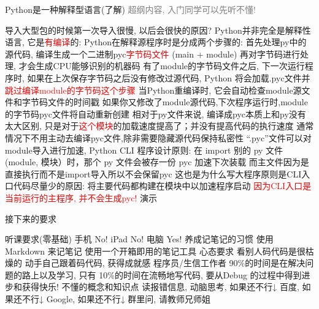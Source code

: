 \begin{frame}{Python是一种解释型语言(了解)}
    \tiny{\textcolor{gray}{超纲内容, 入门同学可以先听不懂!}}
    \begin{myoutline}
        \1 导入大型包的时候第一次导入很慢, 以后会很快的原因?
        \1 Python并非完全是解释性语言, 它是\textcolor{red}{有编译}的:
            \2 Python在解释源程序时是分成两个步骤的:
                \3 首先处理py中的源代码, 编译生成一个二进制pyc\textcolor{red}{字节码文件} (main + module)
                \3 再对字节码进行处理, 才会生成CPU能够识别的机器码
                \3 有了module的字节码文件之后, 下一次运行程序时, 如果在上次保存字节码之后没有修改过源代码, Python 将会加载.pyc文件并\textcolor{red}{跳过编译module的字节码这个步骤}
                \3 当Python重编译时, 它会自动检查module源文件和字节码文件的时间戳
                \3 如果你又修改了module源代码,下次程序运行时,module的字节码pyc文件将自动重新创建
            \2 相对于py文件来说, 编译成pyc本质上和py没有太大区别, 只是对于\textcolor{red}{这个模块}的加载速度提高了；并没有提高代码的执行速度
            \2 通常情况下不用主动去编译pyc文件,除非需要隐藏源代码保持私密性
        \1 ``.pyc''文件可以对module导入进行加速, Python CLI 程序设计原则:
            \2 在 import 别的 py 文件(module, 模块）时，那个 py 文件会被存一份 pyc 加速下次装载
            \2 而主文件因为是直接执行而不是import导入所以不会保留pyc
            \2 这也是为什么写大程序原则是CLI入口代码尽量少的原因:
                \3 将主要代码都构建在模块中以加速程序启动
                \3 \textcolor{red}{因为CLI入口是当前运行的主程序, 并不会生成pyc!}
        \1 演示
    \end{myoutline}
\end{frame}





\begin{frame}[standout]{接下来的要求}
    \begin{myoutline}
        \1 听课要求(零基础)
            \2 手机 No!
            \2 iPad No!
            \2 电脑 Yes!
        \1 养成记笔记的习惯
            \2 使用 Markdown 来记笔记
            \2 使用一个开箱即用的笔记工具
        \1 心态要求
            \2 看别人码代码是很枯燥的
            \2 动手自己跟着码代码, 获得成就感
            \2 程序员/生信工作者 90\%的时间是在解决问题的路上以及学习, 只有 10\%的时间在流畅地写代码, 要从Debug 的过程中得到进步和获得快乐!
        \1 不懂的概念和知识点
            \2 读报错信息, 动脑思考, 如果还不行↓
            \2 百度, 如果还不行↓
            \2 Google, 如果还不行↓
            \2 群里问, 请教师兄师姐
    \end{myoutline}
\end{frame}

